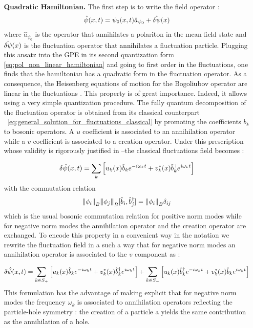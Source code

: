 \bigskip
\textbf{Quadratic Hamiltonian.} The first step is to write the field operator : 
\begin{equation}
    \hat{\psi}(x,t)= \psi_0(x,t)\hat{a}_{\psi_0}+\hat{\delta\psi}(x)
\end{equation}
where $\hat{a}_{\psi_0}$ is the operator that annihilates a polariton in the mean field state and $\hat{\delta\psi}(x)$ is the fluctuation operator that 
annihilates a fluctuation particle. Plugging this ansatz into the GPE in its second quantization form \ref{eq:pol_non_linear_hamiltonian} and going to first order in the fluctuations, one
finds that the hamiltonian has a quadratic form in the fluctuation operator. As a consequence, the Heisenberg
equations of motion for the Bogoliubov operator are linear in the fluctuations \cite{castin_bose-einstein_2001}. This property is of great importance.
Indeed, it allows using a very simple quantization procedure. The fully quantum decomposition of the 
fluctuation operator is obtained from its classical counterpart ~\ref{eq:general_solution_for_fluctuations_classical} by promoting the coefficients $b_k$ to bosonic operators. A $u$ coefficient is associated to an annihilation operator while a $v$ coefficient is associated to a creation operator.
 Under this prescription--whose validity is rigorously justified in \cite{castin_low-temperature_1998}--the classical fluctuations field becomes :

\begin{equation}
    \delta\hat{\psi}(x,t) =\sum_{k}\left[u_k(x)\hat{b}_k e^{-i\omega_k t}+ v^*_k(x)\hat{b}_k^\dagger e^{i\omega_k t}\right]
\end{equation}
with the commutation relation 
\begin{equation}
    \norm{\phi_i}_B\norm{\phi_j}_B[\hat{b}_i, \hat{b}_j^\dagger]  = \norm{\phi_i}_B\delta_{ij}
\end{equation}
which is the usual bosonic commutation relation for positive norm modes while for negative norm modes the annihilation operator and the creation operator are exchanged. To encode this property in a convenient way in the notation we rewrite the fluctuation field in a such a way that for negative norm modes an annihilation operator
is associated to the $v$ component as :

\begin{equation}
    \delta\hat{\psi}(x,t) =\sum_{k\in S_+}\left[u_k(x)\hat{b}_k e^{-i\omega_k t}+ v^*_k(x)\hat{b}_k^\dagger e^{i\omega_k t}\right] + \sum_{k\in S_-}\left[u_k(x)\hat{b}_k^\dagger e^{-i\omega_k t}+ v^*_k(x)\hat{b}_k e^{i\omega_k t}\right]
    \label{eq:fluctuation_field_local_modes}
\end{equation}
This formulation has the advantage of making explicit that for negative norm modes the frequency $\omega_k$ is associated to annihilation operators reflecting the particle-hole symmetry :
the creation of a particle a yields the same contribution as the annihilation of a hole.



